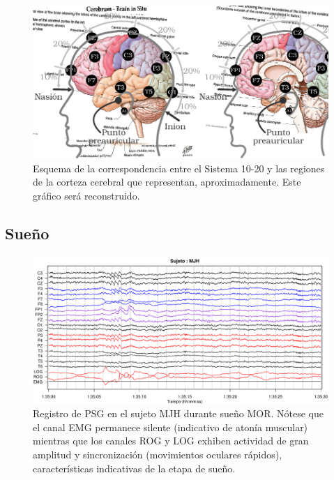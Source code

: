 \begin{figure}
\centering
\includegraphics[width=\linewidth]{./img_diagramas/cerebro_1020.pdf} 
\caption{Esquema de la correspondencia entre el Sistema 10-20 y las regiones de la corteza
cerebral que representan, aproximadamente. Este gráfico será reconstruido.
}
\label{corresponde_1020}
\end{figure}


\subsection{Sueño}

\begin{figure}
\centering
\includegraphics[width=\linewidth]
{./img_ejemplos/MJH_190_PDG_lucirse_PSG.pdf}
\caption{Registro de PSG en el sujeto MJH durante sue\~no MOR. N\'otese que el canal EMG permanece 
silente (indicativo de aton\'ia muscular) mientras que los canales ROG y LOG exhiben actividad de 
gran amplitud y sincronizaci\'on (movimientos oculares r\'apidos), caracter\'isticas indicativas de
la etapa de sue\~no.}
\label{ejemplos_mor}
\end{figure}

%

